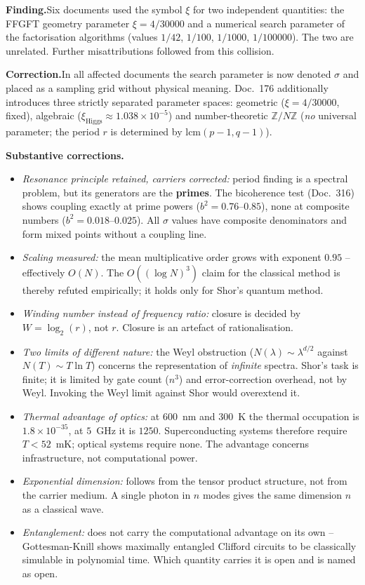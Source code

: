 \smallskip\noindent\textbf{Finding.}\quad Six documents used the symbol
$\xi$ for two independent quantities: the FFGFT geometry parameter
$\xi = 4/30000$ and a numerical search parameter of the factorisation
algorithms (values $1/42$, $1/100$, $1/1000$, $1/100000$). The two are
unrelated. Further misattributions followed from this collision.

\smallskip\noindent\textbf{Correction.}\quad In all affected documents the
search parameter is now denoted $\sigma$ and placed as a sampling grid
without physical meaning. Doc.~176 additionally introduces three strictly
separated parameter spaces: geometric ($\xi = 4/30000$, fixed), algebraic
($\xi_{\text{Higgs}} \approx 1.038\times10^{-5}$) and number-theoretic
$\mathbb{Z}/N\mathbb{Z}$ (\emph{no} universal parameter; the period $r$ is
determined by $\mathrm{lcm}(p-1,q-1)$).

\smallskip\noindent\textbf{Substantive corrections.}
\begin{itemize}
  \item \emph{Resonance principle retained, carriers corrected:} period
    finding is a spectral problem, but its generators are the
    \textbf{primes}. The bicoherence test (Doc.~316) shows coupling exactly
    at prime powers ($b^2 = 0.76$--$0.85$), none at composite numbers
    ($b^2 = 0.018$--$0.025$). All $\sigma$ values have composite
    denominators and form mixed points without a coupling line.
  \item \emph{Scaling measured:} the mean multiplicative order grows with
    exponent $0.95$ -- effectively $O(N)$. The $O((\log N)^3)$ claim for the
    classical method is thereby refuted empirically; it holds only for
    Shor's quantum method.
  \item \emph{Winding number instead of frequency ratio:} closure is decided
    by $W = \log_2(r)$, not $r$. Closure is an artefact of rationalisation.
  \item \emph{Two limits of different nature:} the Weyl obstruction
    ($N(\lambda) \sim \lambda^{d/2}$ against $N(T) \sim T\ln T$) concerns
    the representation of \emph{infinite} spectra. Shor's task is finite;
    it is limited by gate count ($n^3$) and error-correction overhead, not
    by Weyl. Invoking the Weyl limit against Shor would overextend it.
  \item \emph{Thermal advantage of optics:} at $600$~nm and $300$~K the
    thermal occupation is $1.8\times10^{-35}$, at $5$~GHz it is $1250$.
    Superconducting systems therefore require $T < 52$~mK; optical systems
    require none. The advantage concerns infrastructure, not computational
    power.
  \item \emph{Exponential dimension:} follows from the tensor product
    structure, not from the carrier medium. A single photon in $n$ modes
    gives the same dimension $n$ as a classical wave.
  \item \emph{Entanglement:} does not carry the computational advantage on
    its own -- Gottesman-Knill shows maximally entangled Clifford circuits
    to be classically simulable in polynomial time. Which quantity carries
    it is open and is named as open.
\end{itemize}


